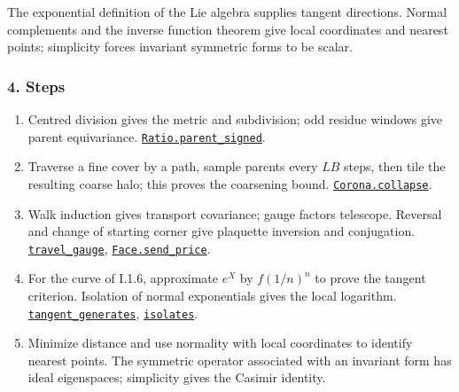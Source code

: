 \documentclass[
  letterpaper,
  11pt]{article}
\providecommand{\tightlist}{%
  \setlength{\itemsep}{0pt}\setlength{\parskip}{0pt}}
\begin{document}
The exponential definition of the Lie algebra supplies tangent
directions. Normal complements and the inverse function theorem give
local coordinates and nearest points; simplicity forces invariant
symmetric forms to be scalar.

\subsubsection{4. Steps}\label{steps}

\begin{enumerate}
\def\labelenumi{\arabic{enumi}.}
\tightlist
\item
  Centred division gives the metric and subdivision; odd residue windows
  give parent equivariance.
  \href{https://github.com/yang-mills-group/OpenAI-YM-20261028/blob/3456e5e75cf8d4cd558955a5c7638fba2d68f464/YM/Lattice/Subdivision.lean\#L154-L157}{\texttt{Ratio.parent\_signed}}.
\item
  Traverse a fine cover by a path, sample parents every \(LB\) steps,
  then tile the resulting coarse halo; this proves the coarsening bound.
  \href{https://github.com/yang-mills-group/OpenAI-YM-20261028/blob/3456e5e75cf8d4cd558955a5c7638fba2d68f464/YM/Corona/Spend.lean\#L73-L105}{\texttt{Corona.collapse}}.
\item
  Walk induction gives transport covariance; gauge factors telescope.
  Reversal and change of starting corner give plaquette inversion and
  conjugation.
  \href{https://github.com/yang-mills-group/OpenAI-YM-20261028/blob/3456e5e75cf8d4cd558955a5c7638fba2d68f464/YM/Lattice/Path.lean\#L141-L143}{\texttt{travel\_gauge}},
  \href{https://github.com/yang-mills-group/OpenAI-YM-20261028/blob/3456e5e75cf8d4cd558955a5c7638fba2d68f464/YM/Lattice/Faces.lean\#L128-L143}{\texttt{Face.send\_price}}.
\item
  For the curve of I.1.6, approximate \(e^X\) by \(f(1/n)^n\) to prove
  the tangent criterion. Isolation of normal exponentials gives the
  local logarithm.
  \href{https://github.com/yang-mills-group/OpenAI-YM-20261028/blob/3456e5e75cf8d4cd558955a5c7638fba2d68f464/YM/Gauge/Lie.lean\#L98-L111}{\texttt{tangent\_generates}},
  \href{https://github.com/yang-mills-group/OpenAI-YM-20261028/blob/3456e5e75cf8d4cd558955a5c7638fba2d68f464/YM/Gauge/Chart.lean\#L71-L91}{\texttt{isolates}}.
\item
  Minimize distance and use normality with local coordinates to identify
  nearest points. The symmetric operator associated with an invariant
  form has ideal eigenspaces; simplicity gives the Casimir identity.

\end{enumerate}
\end{document}
